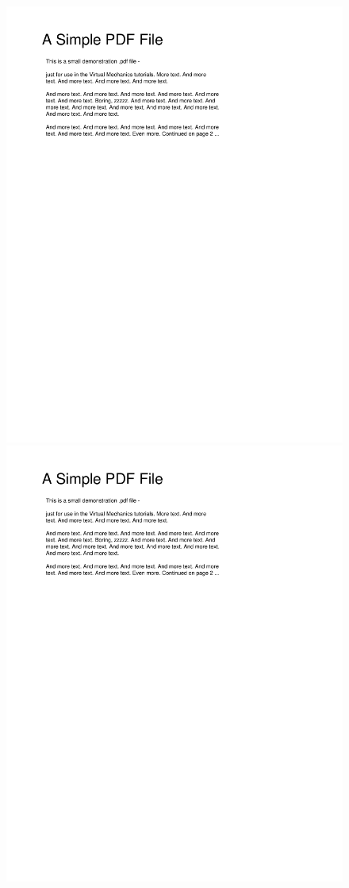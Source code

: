 \documentclass[twoside]{article}
\begin{document}
\begin{figure}[]
\centering
\includegraphics[]{examplefiga.pdf}
\includegraphics[]{examplefigb.pdf}

\end{figure}
\end{document}

